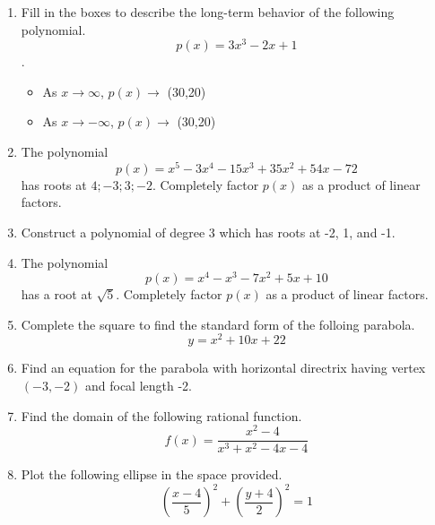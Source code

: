 \documentclass{article}
\begin{document}
\ReviewTitle[class={College Algebra}, for={Test 3}]

\begin{enumerate}
\item Fill in the boxes to describe the long-term behavior of the following polynomial. \[ p(x) = 3x^3 - 2x + 1 \].

\begin{itemize}
\item As $x \rightarrow \infty$, $p(x) \rightarrow$ \framebox(30,20){} \vspace{0.5cm}
\item As $x \rightarrow -\infty$, $p(x) \rightarrow$ \framebox(30,20){}
\end{itemize} \vspace{1cm}

\item The polynomial \[ p(x) = x^5 - 3x^4 - 15x^3 + 35x^2 + 54x - 72 \] has roots at ${4;-3;3;-2}$. Completely factor $p(x)$ as a product of linear factors. \vspace{6cm}

\item Construct a polynomial of degree 3 which has roots at -2, 1, and -1. \vspace{5cm}

\newpage

\item The polynomial \[ p(x) = x^4 - x^3 - 7x^2 + 5x + 10 \] has a root at $\sqrt{5}$. Completely factor $p(x)$ as a product of linear factors. \vspace{9cm}

\item Complete the square to find the standard form of the folloing parabola. \[ y = x^2 + 10x + 22 \] \vspace{6cm}

\item Find an equation for the parabola with horizontal directrix having vertex $(-3, -2)$ and focal length -2. \vspace{2cm}

\newpage

\item Find the domain of the following rational function. \[ f(x) = \frac{x^2 - 4}{x^3 + x^2 - 4x - 4} \] \vspace{5cm}

\item Plot the following ellipse in the space provided. \[ \left(\frac{x - 4}{5}\right)^2 + \left(\frac{y + 4}{2}\right)^2 = 1 \]


\end{enumerate}
\end{document}
